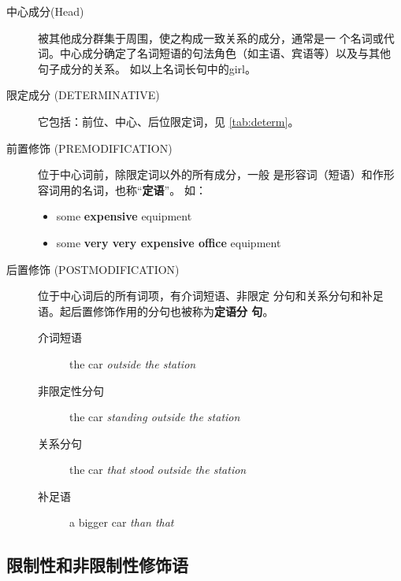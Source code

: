 \begin{description}
\item[中心成分(Head)] 被其他成分群集于周围，使之构成一致关系的成分，通常是一
  个名词或代词。中心成分确定了名词短语的句法角色（如主语、宾语等）以及与其他
  句子成分的关系。 如以上名词长句中的girl。

\item[限定成分 (DETERMINATIVE)] 它包括：前位、中心、后位限定词，见 \cref{tab:determ}。

\item[前置修饰 (PREMODIFICATION)] 位于中心词前，除限定词以外的所有成分，一般
  是形容词（短语）和作形容词用的名词，也称“\textbf{定语}”。 如：
  \begin{itemize}
  \item some \textbf{expensive} equipment
  \item some \textbf{very very expensive office} equipment
  \end{itemize}

\item[后置修饰 (POSTMODIFICATION)] 位于中心词后的所有词项，有介词短语、非限定
  分句和关系分句和补足语。起后置修饰作用的分句也被称为\textbf{定语分
    句}。 
  \begin{description}
  \item[介词短语] the car \emph{outside the station}
  \item[非限定性分句] the car \emph{standing outside the station}
  \item[关系分句] the car \emph{that stood outside the station}
  \item[补足语] a bigger car \emph{than that}
  \end{description}

\end{description}

\subsection{限制性和非限制性修饰语}

